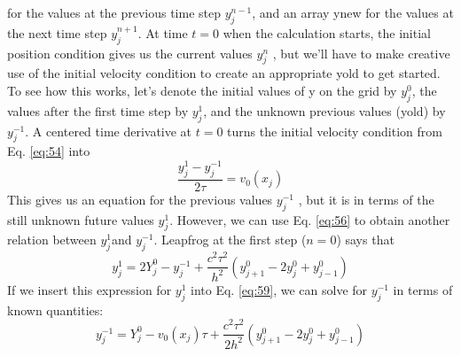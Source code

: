 for the values at the previous time step $ y_j^{n-1}$, and an array ynew for the values
at the next time step $ y_j^{n+1}$. At time $t = 0$ when the calculation starts, the initial
position condition gives us the current values $ y_j^n$ , but we\rq ll have to make creative
use of the initial velocity condition to create an appropriate yold to get started.
To see how this works, let\rq s denote the initial values of y on the grid by $ y_j^0 $, the
values after the first time step by $ y_j^{1} $, and the unknown previous values (yold) by
$ y_j^{-1} $. A centered time derivative at $t = 0$ turns the initial velocity condition from
Eq. \eqref{eq:54} into
\begin{equation}\label{eq:59}
\frac{y_j^1 - y_j^{-1}}{2 \tau} = v_0(x_j)
\end{equation}
This gives us an equation for the previous values $y_j^{-1}$ , but it is in terms of the
still unknown future values $y_j^{1}$. However, we can use Eq. \eqref{eq:56} to obtain another
relation between $y_j^{1}$and $y_j^{-1}$. Leapfrog at the first step ($n = 0$) says that
\begin{equation}\label{eq:510}
y_j^1 = 2Y^0_j - y_j^{-1} + \frac{c^2 \tau^2}{h^2}(y^0_{j+1}-2y^0_j+y^0_{j-1})
\end{equation}
If we insert this expression for $y^1_j$ into Eq. \eqref{eq:59}, we can solve for $y^{-1}_j $ in terms of
known quantities:
\begin{equation}\label{eq:511}
y_j^{-1} = Y^0_j - v_0(x_j)\tau + \frac{c^2 \tau^2}{2h^2}(y^0_{j+1}-2y^0_j+y^0_{j-1})
\end{equation}

